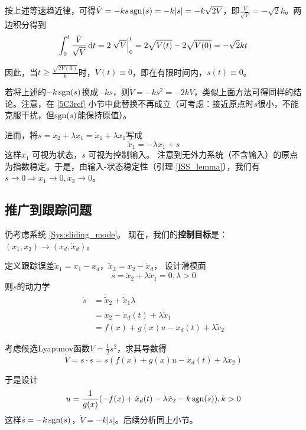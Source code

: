   按上述等速趋近律，可得$\dot{V} = - ks \operatorname{sgn} (s) = - k | s | =
  - k \sqrt{2 V}$，即$\frac{\dot{V}}{\sqrt{V}} = - \sqrt{2} k $。两边积分得到
  \[ \int^t_0 \frac{\dot{V}}{\sqrt{V}} \mathop{}\!\mathrm{d} t = 2 \left. \sqrt{V} \right|^t_0 = 2
   \sqrt{V (t)} - 2 \sqrt{V (0)}  = - \sqrt{2} k  t \]
  
  因此，当$t \geq \frac{\sqrt{2 V (0)}}{k}$时，$V (t) \equiv 0$，即在有限时间内，$s (t) \equiv 0$。

  \begin{note}
    若将上述的$-k\operatorname{sgn}(s)$换成$-ks$，则$\dot{V} = - ks^2=  - 2k V$，类似上面方法可得同样的结论。注意，在 \ref{5C3ref} 小节中此替换不再成立（可考虑：接近原点时$s$很小，不能克服干扰，但$\operatorname{sgn}(s)$能保持原值）。
  \end{note}

  进而，将$s = x_2 + \lambda x_1 = \dot{x}_1 + \lambda x_1$写成
  \[ \dot{x}_1 = - \lambda x_1 + s \]
  这样$x_1$ 可视为状态，$s$ 可视为控制输入。
  注意到无外力系统（不含输入）的原点为指数稳定。于是，由输入-状态稳定性（引理 \ref{ISS_lemma}），我们有$s \rightarrow 0 \Rightarrow x_1 \rightarrow 0, x_2 \rightarrow 0$。

\subsection{推广到跟踪问题}

仍考虑系统 \eqref{Sys:sliding_mode}。
现在，我们的{\bf 控制目标}是：$(x_1, x_2) \rightarrow (x_d, \dot{x}_d)$。

定义跟踪误差$\tilde{x}_1 = x_1 - x_d$，$\tilde{x}_2 = x_2 - \dot{x}_d$，
设计滑模面\[s = \tilde{x}_2 + \lambda \tilde{x}_1 = 0,\lambda>0\]
则$s$的动力学
\begin{align*}
\dot{s} &= \dot{\tilde{x}}_2 + \dot{\tilde{x}}_1 \lambda \\
&= \dot{x}_2 -\ddot{x}_d (t) + \lambda \dot{\tilde{x}}_1 \\
&= f (x) + g (x) u - \ddot{x}_d (t) +\lambda \tilde{x}_2
\end{align*}

考虑候选Lyapunov函数$V = \frac{1}{2} s^2$，求其导数得
\[\dot{V} = s \cdot \dot{s} = s (f (x) + g (x) u -
\ddot{x}_d (t) + \lambda \tilde{x}_2)\]

于是设计\begin{equation}
    u = \frac{1}{g (x)} (- f (x) + \ddot{x}_d (t) - \lambda \tilde{x}_2 - k
\operatorname{sgn} (s)),k>0\label{tracking_control}
\end{equation}这样$\dot{s} = - k \operatorname{sgn} (s)$，$\dot{V}=-k|s|$。后续分析同上小节。

